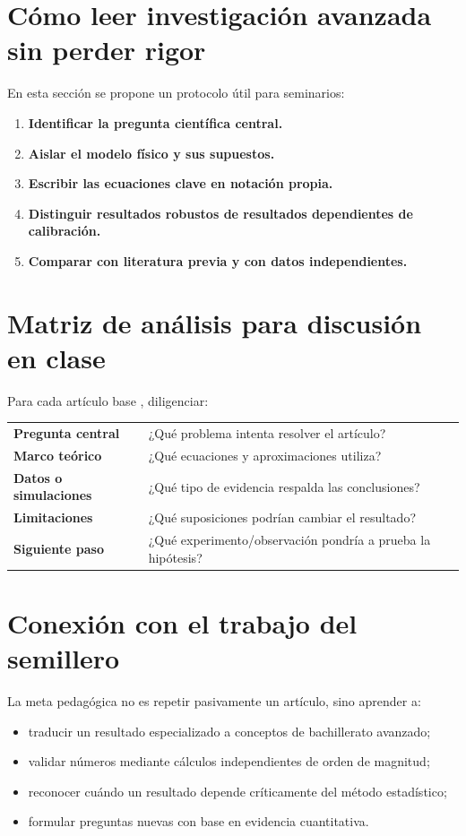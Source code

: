 \documentclass[12pt,oneside]{book}
\begin{document}
\section{Cómo leer investigación avanzada sin perder rigor}

En esta sección se propone un protocolo útil para seminarios:
\begin{enumerate}[leftmargin=1.5em]
  \item \textbf{Identificar la pregunta científica central.}
  \item \textbf{Aislar el modelo físico y sus supuestos.}
  \item \textbf{Escribir las ecuaciones clave en notación propia.}
  \item \textbf{Distinguir resultados robustos de resultados dependientes de calibración.}
  \item \textbf{Comparar con literatura previa y con datos independientes.}
\end{enumerate}

\section{Matriz de análisis para discusión en clase}

Para cada artículo base \citep{arxiv2603,arxiv2001,srep2024}, diligenciar:
\begin{center}
\begin{tabular}{p{} p{}}
\textbf{Pregunta central} & ¿Qué problema intenta resolver el artículo? \\
\textbf{Marco teórico} & ¿Qué ecuaciones y aproximaciones utiliza? \\
\textbf{Datos o simulaciones} & ¿Qué tipo de evidencia respalda las conclusiones? \\
\textbf{Limitaciones} & ¿Qué suposiciones podrían cambiar el resultado? \\
\textbf{Siguiente paso} & ¿Qué experimento/observación pondría a prueba la hipótesis? \\
\end{tabular}
\end{center}

\section{Conexión con el trabajo del semillero}

La meta pedagógica no es repetir pasivamente un artículo, sino aprender a:
\begin{itemize}[leftmargin=1.5em]
  \item traducir un resultado especializado a conceptos de bachillerato avanzado;
  \item validar números mediante cálculos independientes de orden de magnitud;
  \item reconocer cuándo un resultado depende críticamente del método estadístico;
  \item formular preguntas nuevas con base en evidencia cuantitativa.
\end{itemize}
\end{document}

